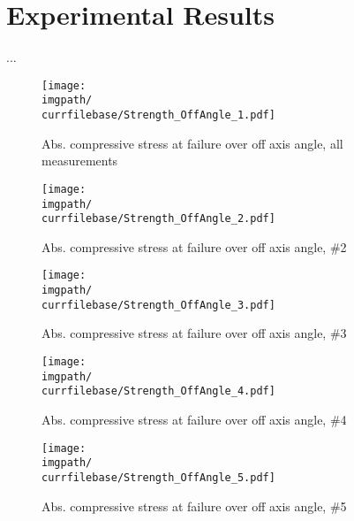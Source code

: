 \chapter{Experimental Results}
\label{chap:\currfilebase}
...

\begin{figure}[!ht]
    \centering
    \texttt{[image: \\imgpath/\\currfilebase/Strength\_OffAngle\_1.pdf]}
    \caption{Abs. compressive stress at failure over off axis angle, all measurements}
    \label{fig:strength_offAngle_1}
\end{figure}
\begin{figure}[!ht]
    \centering
    \texttt{[image: \\imgpath/\\currfilebase/Strength\_OffAngle\_2.pdf]}
    \caption{Abs. compressive stress at failure over off axis angle, \#2}
    \label{fig:strength_offAngle_2}
\end{figure}
\begin{figure}[!ht]
    \centering
    \texttt{[image: \\imgpath/\\currfilebase/Strength\_OffAngle\_3.pdf]}
    \caption{Abs. compressive stress at failure over off axis angle, \#3}
    \label{fig:strength_offAngle_3}
\end{figure}
\begin{figure}[!ht]
    \centering
    \texttt{[image: \\imgpath/\\currfilebase/Strength\_OffAngle\_4.pdf]}
    \caption{Abs. compressive stress at failure over off axis angle, \#4}
    \label{fig:strength_offAngle_4}
\end{figure}
\begin{figure}[!ht]
    \centering
    \texttt{[image: \\imgpath/\\currfilebase/Strength\_OffAngle\_5.pdf]}
    \caption{Abs. compressive stress at failure over off axis angle, \#5}
    \label{fig:strength_offAngle_5}
\end{figure}

